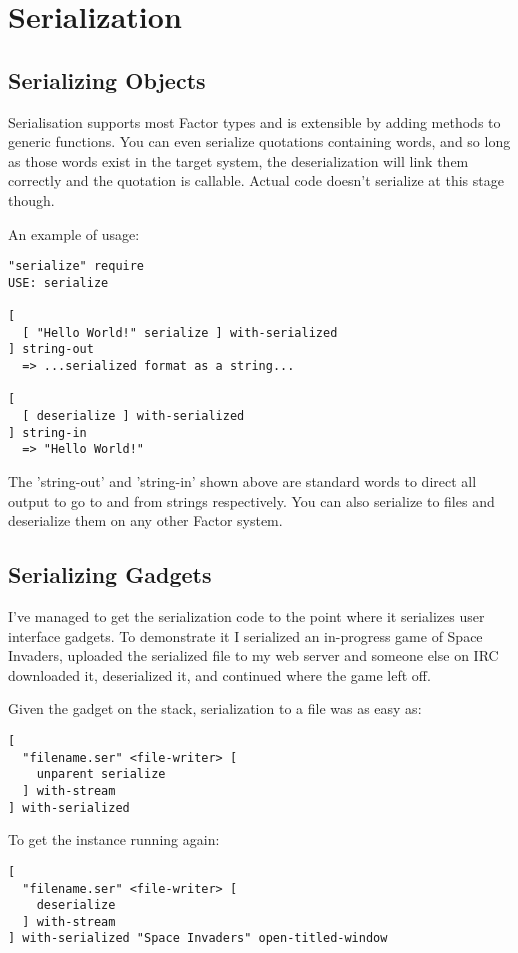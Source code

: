 \chapter{Serialization}\label{serialization}

\section{Serializing Objects}

Serialisation supports most Factor types and is extensible by adding methods to generic functions. You can even serialize quotations containing words, and so long as those words exist in the target system, the deserialization will link them correctly and the quotation is callable. Actual code doesn't serialize at this stage though.

An example of usage:

\begin{verbatim}
"serialize" require
USE: serialize

[
  [ "Hello World!" serialize ] with-serialized
] string-out
  => ...serialized format as a string...

[
  [ deserialize ] with-serialized
] string-in 
  => "Hello World!"
\end{verbatim}

The 'string-out' and 'string-in' shown above are standard words to direct all output to go to and from strings respectively. You can also serialize to files and deserialize them on any other Factor system.

\section{Serializing Gadgets}
I've managed to get the serialization code to the point where it serializes user interface gadgets. To demonstrate it I serialized an in-progress game of Space Invaders, uploaded the serialized file to my web server and someone else on IRC downloaded it, deserialized it, and continued where the game left off.

Given the gadget on the stack, serialization to a file was as easy as:

\begin{verbatim}
[ 
  "filename.ser" <file-writer> [ 
    unparent serialize 
  ] with-stream 
] with-serialized
\end{verbatim}

To get the instance running again:

\begin{verbatim}
[ 
  "filename.ser" <file-writer> [ 
    deserialize 
  ] with-stream 
] with-serialized "Space Invaders" open-titled-window
\end{verbatim}
